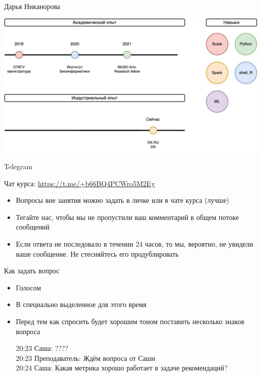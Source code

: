 \documentclass[11pt,aspectratio=169,handout]{beamer}
\begin{document}
\begin{frame}{Дарья Никанорова}

\begin{center}
\includegraphics[scale=0.23]{images/about-me-dasha.jpeg}
\end{center}

\end{frame}

\begin{frame}{Telegram}

Чат курса: \url{https://t.me/+b66BQ4PCWro5M2Ey}

\vfill

\begin{itemize}
\item Вопросы вне занятия можно задать в личке или в чате курса (лучше)
\item Тегайте нас, чтобы мы не пропустили ваш комментарий в общем потоке сообщений
\item Если ответа не последовало в течении 24 часов, то мы, вероятно, не увидели ваше сообщение. Не стесняйтесь его продублировать
\end{itemize}

\end{frame}

\begin{frame}{Как задать вопрос}

\begin{itemize}
\item Голосом
\item В специально выделенное для этого время
\item Перед тем как спросить будет хорошим тоном поставить несколько знаков вопроса
\begin{tcolorbox}[colback=gray!5,colframe=gray!80,title=]
20:23 Саша: ???? \\
20:23 Преподаватель: Ждём вопроса от Саши \\
20:24 Саша: Какая метрика хорошо работает в задаче рекомендаций?
\end{tcolorbox}
\end{itemize}

\end{frame}
\end{document}
